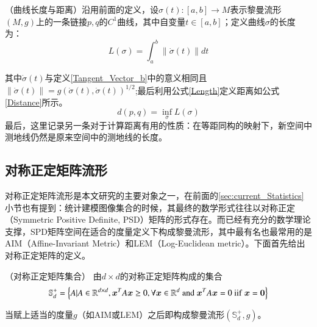 \begin{definition}
{\heiti（曲线长度与距离）}沿用前面的定义，设$\sigma(t):[a,b]\rightarrow  M$表示黎曼流形$(M,g)$上的一条链接$p,q$的$C^{1}$曲线，其中自变量$t \in [a,b]$；定义曲线$\sigma$的长度为：
\begin{equation}
\label{Length}
L(\sigma)=\int_{a}^{b}{\|\dot{\sigma}(t)\|}dt
\end{equation}
\end{definition}
其中$\dot{\sigma}(t)$与定义\ref{Tangent_Vector_b}中的意义相同且$\|\dot{\sigma}(t)\|=g(\dot{\sigma}(t),\dot{\sigma}(t))^{1/2}$;最后利用公式\ref{Length}定义距离如公式\ref{Distance}所示。
\begin{equation}
\label{Distance}
d(p,q)=\inf_{\sigma}L(\sigma)
\end{equation}
最后，这里记录另一条对于计算距离有用的性质：在等距同构的映射下，新空间中测地线仍然是原来空间中的测地线的长度。
\subsection{对称正定矩阵流形}
\label{sec:Manifold_SPD}
对称正定矩阵流形是本文研究的主要对象之一，在前面的\ref{sec:current_Statistics}小节也有提到：统计建模图像集合的时候，其最终的数学形式往往以对称正定（Symmetric Positive Definite, PSD）矩阵的形式存在。而已经有充分的数学理论支撑，SPD矩阵空间在适合的度量定义下构成黎曼流形，其中最有名也最常用的是AIM\cite{AIM_metric}（Affine-Invariant Metric）和LEM\cite{LEM_metric}（Log-Euclidean metric）。下面首先给出对称正定矩阵的定义。
\begin{definition}
{\heiti（对称正定矩阵集合）} 由$d \times d$的对称正定矩阵构成的集合
\begin{equation}
\label{SPD_Matrices}
\mathbb{S}_{d}^{+}=\left\{A|A \in \mathbb{R}^{d\times d},\bm{x}^{T}A\bm{x} \geq 0,\forall \bm{x} \in \mathbb{R}^{d}~{\rm and}~\bm{x}^{T}A\bm{x}=0~{\rm iif}~\bm{x}=\bm{0}\right\}
\end{equation}
\end{definition}
当赋上适当的度量$g$（如AIM\cite{AIM_metric}或LEM\cite{LEM_metric}）之后即构成黎曼流形$(\mathbb{S}_{d}^{+},g)$。

